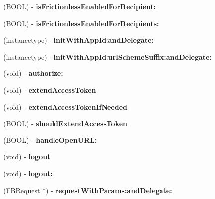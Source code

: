 \begin{DoxyCompactItemize}
(B\+O\+OL) -\/ {\bfseries is\+Frictionless\+Enabled\+For\+Recipient\+:}
\item 
\mbox{\label{interfaceFacebook_a2c23a238ccb9a2e546ddbd469e0973a4}} 
(B\+O\+OL) -\/ {\bfseries is\+Frictionless\+Enabled\+For\+Recipients\+:}
\item 
\mbox{\label{interfaceFacebook_a3e3063f63293e9a9f7518b7275fae59a}} 
(instancetype) -\/ {\bfseries init\+With\+App\+Id\+:and\+Delegate\+:}
\item 
\mbox{\label{interfaceFacebook_adf179bd2617bdbb233b2b5db98efaf01}} 
(instancetype) -\/ {\bfseries init\+With\+App\+Id\+:url\+Scheme\+Suffix\+:and\+Delegate\+:}
\item 
\mbox{\label{interfaceFacebook_a57c1792ab63e37d31856d9e1c7cf35b6}} 
(void) -\/ {\bfseries authorize\+:}
\item 
\mbox{\label{interfaceFacebook_aaeda683efcfaf74bf88a446cf9829fd6}} 
(void) -\/ {\bfseries extend\+Access\+Token}
\item 
\mbox{\label{interfaceFacebook_a6b7ad0f8993895f182d002ba3d390d04}} 
(void) -\/ {\bfseries extend\+Access\+Token\+If\+Needed}
\item 
\mbox{\label{interfaceFacebook_a40f4232e29af0ce94c74152f2623f0d4}} 
(B\+O\+OL) -\/ {\bfseries should\+Extend\+Access\+Token}
\item 
\mbox{\label{interfaceFacebook_af59e46399f97cdb3f7f235822a30f06f}} 
(B\+O\+OL) -\/ {\bfseries handle\+Open\+U\+R\+L\+:}
\item 
\mbox{\label{interfaceFacebook_a6e0221b80dba8a301e720897fec6e193}} 
(void) -\/ {\bfseries logout}
\item 
\mbox{\label{interfaceFacebook_a204f10894608b3e10943e15d9861c9be}} 
(void) -\/ {\bfseries logout\+:}
\item 
\mbox{\label{interfaceFacebook_a80611b3dd62992ad47e6de425a8b67dd}} 
(\hyperlink{interfaceFBRequest}{F\+B\+Request} $\ast$) -\/ {\bfseries request\+With\+Params\+:and\+Delegate\+:}

\end{DoxyCompactItemize}
